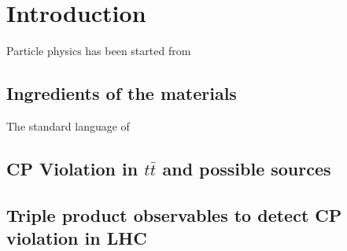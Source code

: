 

\section{Introduction}
\label{sec:Introduction}

Particle physics has been started from 

	\subsection{Ingredients of the materials}
	\label{ssec:IntroToSM}

		The standard language of 

	\subsection{CP Violation in $t\bar{t}$ and possible sources}
	\label{ssec:Intro_CPVpossible}

	\subsection{Triple product observables to detect CP violation in LHC}
	\label{ssec:Intro_TPinLHC}

\FloatBarrier
